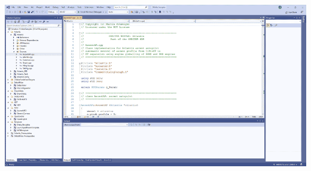 \documentclass[a4paper]{article}
\begin{document}
\begin{center}
\includegraphics[width=1.0\linewidth]{assets/vs.png}
\end{center}
\end{document}
